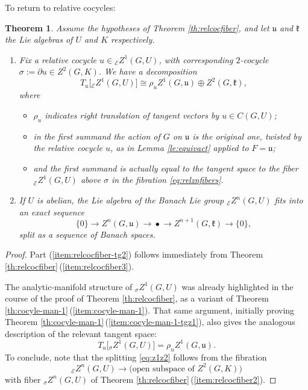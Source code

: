 \documentclass[10pt,a4paper]{amsart}
\numberwithin{equation}{section}
\newtheorem{Theorem}{Theorem}[section]
\newcommand\cE{{\mathcal E}}
\newcommand\fk{{\mathfrak k}}
\newcommand\fu{{\mathfrak u}}
\begin{document}
To return to relative cocycles:

\begin{Theorem}\label{th:relcocfiber-tg}
 Assume the hypotheses of Theorem {\rm \ref{th:relcocfiber}}, and let $\fu$ and $\fk$ the Lie algebras of $U$ and $K$ respectively.
 \begin{enumerate}[$(1)$]\itemsep=0pt

 \item\label{item:relcocfiber-tg1} Fix a relative cocycle $u\in {}_{\cE}Z^1(G,U)$, with corresponding $2$-cocycle $\sigma:=\partial u\in Z^2(G,K)$. We have a decomposition
 \begin{equation}\label{eq:z1z2}
 T_{u}\big[{}_{\cE}Z^1(G,U)\big]
 \cong
 \rho_{u} Z^1(G,\fu)
 \oplus
 Z^2(G,\fk),
 \end{equation}
 where
 \begin{itemize}\itemsep=0pt
 \item $\rho_{u}$ indicates right translation of tangent vectors by ${u}\in C(G,U)$;
 \item in the first summand the action of $G$ on $\fu$ is the original one, twisted by the relative cocycle $u$, as in Lemma {\rm \ref{le:equivact}} applied to $F=\fu$;
 \item and the first summand is actually {\it equal} to the tangent space to the fiber ${}_{\cE}Z^1(G,U)$ above $\sigma$ in the fibration \eqref{eq:relznfibers}.
 \end{itemize}


 \item\label{item:relcocfiber-tg2} If $U$ is abelian, the Lie algebra of the Banach Lie group ${}_{\cE}Z^n(G,U)$ fits into an exact sequence
 \begin{equation*}
 \{0\}\to
 Z^n(G,\fu)
 \xrightarrow{\quad}
 \bullet
 \xrightarrow{\quad}
 Z^{n+1}(G,\fk)
 \to\{0\},
 \end{equation*}
 split as a sequence of Banach spaces.
 \end{enumerate}
\end{Theorem}
\begin{proof}
 Part (\ref{item:relcocfiber-tg2}) follows immediately from Theorem \ref{th:relcocfiber}\,(\ref{item:relcocfiber3}).

 The analytic-manifold structure of ${}_{\sigma}Z^1(G,U)$ was already highlighted in the course of the proof of Theorem \ref{th:relcocfiber}, as a variant of Theorem \ref{th:cocyle-man-1}\,(\ref{item:cocyle-man-1}). That same argument, initially proving Theorem \ref{th:cocyle-man-1}\,(\ref{item:cocyle-man-1-tgz1}), also gives the analogous description of the relevant tangent space:
 \begin{equation}\label{eq:turelz1}
 T_u\big[{}_{\sigma}Z^1(G,U)\big] = \rho_{u} Z^1(G,\fu).
 \end{equation}
 To conclude, note that the splitting \eqref{eq:z1z2} follows from the fibration
 \begin{equation*}
 {}_{\cE}Z^n(G,U)\xrightarrow{\quad}\big(\text{open subspace of }Z^2(G,K)\big)
 \end{equation*}
 with fiber ${}_{\sigma}Z^n(G,U)$ of Theorem \ref{th:relcocfiber}\,(\ref{item:relcocfiber2}).
\end{proof}
\end{document}
